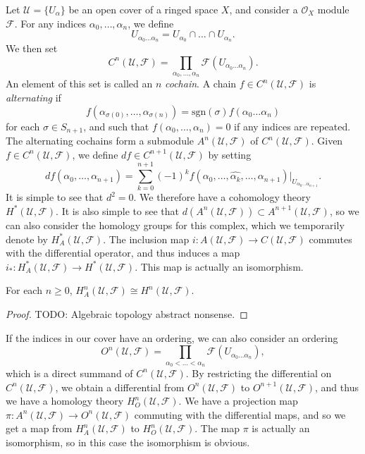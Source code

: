 Let $\mathcal{U} = \{ U_\alpha \}$ be an open cover of a ringed space $X$, and consider a $\mathcal{O}_X$ module $\mathcal{F}$. For any indices $\alpha_0,\dots,\alpha_n$, we define
%
\[ U_{\alpha_0 \dots \alpha_n} = U_{\alpha_0} \cap \dots \cap U_{\alpha_n}. \]
%
We then set
%
\[ C^n(\mathcal{U},\mathcal{F}) = \prod_{\alpha_0,\dots,\alpha_n} \mathcal{F}(U_{\alpha_0 \dots \alpha_n}). \]
%
An element of this set is called an $n$ \emph{cochain}. A chain $f \in C^n(\mathcal{U},\mathcal{F})$ is \emph{alternating} if
%
\[ f(\alpha_{\sigma(0)}, \dots, \alpha_{\sigma(n)}) = \text{sgn}(\sigma) f(\alpha_0 \dots \alpha_n) \]
%
for each $\sigma \in S_{n+1}$, and such that $f(\alpha_0,\dots,\alpha_n) = 0$ if any indices are repeated. The alternating cochains form a submodule $A^n(\mathcal{U},\mathcal{F})$ of $C^n(\mathcal{U},\mathcal{F})$. Given $f \in C^n(\mathcal{U},\mathcal{F})$, we define $df \in C^{n+1}(\mathcal{U},\mathcal{F})$ by setting
%
\[ df(\alpha_0, \dots, \alpha_{n+1}) = \sum_{k = 0}^{n+1} (-1)^k f(\alpha_0, \dots, \widehat{\alpha_k}, \dots, \alpha_{n+1})|_{U_{\alpha_0 \dots \alpha_{n+1}}}. \]
%
It is simple to see that $d^2 = 0$. We therefore have a cohomology theory $H^*(\mathcal{U},\mathcal{F})$. It is also simple to see that $d(A^n(\mathcal{U},\mathcal{F})) \subset A^{n+1}(\mathcal{U},\mathcal{F})$, so we can also consider the homology groups for this complex, which we temporarily denote by $H^*_A(\mathcal{U},\mathcal{F})$. The inclusion map $i: A(\mathcal{U},\mathcal{F}) \to C(\mathcal{U},\mathcal{F})$ commutes with the differential operator, and thus induces a map $i_*: H^*_A(\mathcal{U},\mathcal{F}) \to H^*(\mathcal{U},\mathcal{F})$. This map is actually an isomorphism.

\begin{lemma}
    For each $n \geq 0$, $H^n_A(\mathcal{U},\mathcal{F}) \cong H^n(\mathcal{U},\mathcal{F})$.
\end{lemma}
\begin{proof}
    TODO: Algebraic topology abstract nonsense.
\end{proof}

If the indices in our cover have an ordering, we can also consider an ordering
%
\[ O^n(\mathcal{U},\mathcal{F}) = \prod_{\alpha_0 < \dots < \alpha_n} \mathcal{F}(U_{\alpha_0 \dots \alpha_n}), \]
%
which is a direct summand of $C^n(\mathcal{U},\mathcal{F})$. By restricting the differential on $C^n(\mathcal{U},\mathcal{F})$, we obtain a differential from $O^n(\mathcal{U},\mathcal{F})$ to $O^{n+1}(\mathcal{U},\mathcal{F})$, and thus we have a homology theory $H^n_O(\mathcal{U},\mathcal{F})$. We have a projection map $\pi: A^n(\mathcal{U},\mathcal{F}) \to O^n(\mathcal{U},\mathcal{F})$ commuting with the differential maps, and so we get a map from $H^n_A(\mathcal{U},\mathcal{F})$ to $H^n_O(\mathcal{U},\mathcal{F})$. The map $\pi$ is actually an isomorphism, so in this case the isomorphism is obvious.

